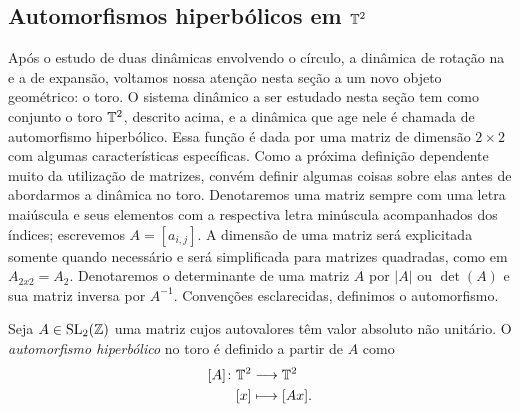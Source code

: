 \begin{comment}
Vamos agora mostrar que vale a relação comutativa $\phi \circ f = \sigma \circ \phi$. Seja $x \in F$ e $\phi(x) = (x_n)_{n \in \Z}$. Nesse caso, sabemos que $x \in R_{(x_n)_{n \in \Z}}$. Aplicando $f$ a $R_{(x_n)}$, temos
	\begin{align*}
	f(R_{(x_n)_{n \in \Z}}) &= f\left( \bigcap_{i \in \Z}f^i(R_{x_i})\right) \\
				&= \bigcap_{i \in \Z}f^{i+1}(R_{x_i}) \\
				&= \bigcap_{i \in \Z}f^i(R_{x_{i-1}}) \\
				&= R_{(x_{n-1})_{n \in \Z}}.
	\end{align*}
Mas isso implica que $f(x) \in R_{(x_{n-1})_{n \in \Z}}$ e, portanto, pela bijetividade de $\phi$, temos $\phi(f(x)) = (x_{n-1})_{n \in \Z}$. Por outro lado, como $\phi(x) = (x_n)_{n \in \Z}$, temos $\sigma(\phi(x)) = (x_{n-1})_{n \in \Z}$. Logo $\phi \circ f = \sigma \circ \phi$.
\end{proof}

\end{comment}

\subsection{Automorfismos hiperbólicos em \ensuremath{\T^2}}

Após o estudo de duas dinâmicas envolvendo o círculo, a dinâmica de rotação na  e a de expansão, voltamos nossa atenção nesta seção a um novo objeto geométrico: o toro. O sistema dinâmico a ser estudado nesta seção tem como conjunto o toro $\mathbb{T}^2$, descrito acima, e a dinâmica que age nele é chamada de automorfismo hiperbólico. Essa função é dada por uma matriz de dimensão $2 \times 2$ com algumas características específicas. Como a próxima definição dependente muito da utilização de matrizes, convém definir algumas coisas sobre elas antes de abordarmos a dinâmica no toro. Denotaremos uma matriz sempre com uma letra maiúscula e seus elementos com a respectiva letra minúscula acompanhados dos índices; escrevemos $A = [a_{i,j}]$. A dimensão de uma matriz será explicitada somente quando necessário e será simplificada para matrizes quadradas, como em $A_{2x2}=A_{2}$. Denotaremos o determinante de uma matriz $A$ por $|A|$ ou $\det(A)$ e sua matriz inversa por $A^{-1}$. Convenções esclarecidas, definimos o automorfismo.

\begin{definition}
Seja $A \in \operatorname{SL}_2(\mathbb{Z})$ uma matriz cujos autovalores têm valor absoluto não unitário. O \textit{automorfismo hiperbólico} no toro é definido a partir de $A$ como
	\begin{align*}
	{[A]}\colon {\mathbb{T}^2} &\longrightarrow {\mathbb{T}^2} \\{[x]} &\longmapsto [Ax].
	\end{align*}
\end{definition}

